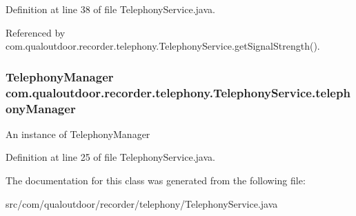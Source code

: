 Definition at line 38 of file Telephony\-Service.\-java.



Referenced by com.\-qualoutdoor.\-recorder.\-telephony.\-Telephony\-Service.\-get\-Signal\-Strength().

\hypertarget{classcom_1_1qualoutdoor_1_1recorder_1_1telephony_1_1TelephonyService_a81a6850efcbcff0936ed580cb171ba3d}{
\subsubsection[{telephony\-Manager}]{\setlength{\rightskip}{0pt plus 5cm}Telephony\-Manager com.\-qualoutdoor.\-recorder.\-telephony.\-Telephony\-Service.\-telephony\-Manager\hspace{0.3cm}{\ttfamily [private]}}}\label{classcom_1_1qualoutdoor_1_1recorder_1_1telephony_1_1TelephonyService_a81a6850efcbcff0936ed580cb171ba3d}
An instance of Telephony\-Manager 

Definition at line 25 of file Telephony\-Service.\-java.



The documentation for this class was generated from the following file\-:\begin{DoxyCompactItemize}
\item 
src/com/qualoutdoor/recorder/telephony/Telephony\-Service.\-java\end{DoxyCompactItemize}
